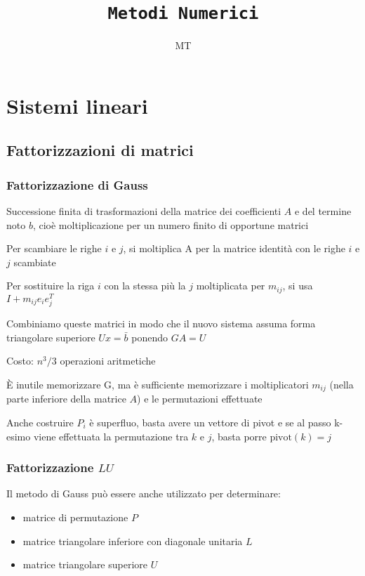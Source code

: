 \documentclass[openany]{book}
\title{\Huge \texttt{Metodi Numerici}}
\date{}
\author{\textsf{MT}}
\begin{document}
\maketitle

\tableofcontents

\chapter{Sistemi lineari}

\section{Fattorizzazioni di matrici}
\subsection{Fattorizzazione di Gauss}

Successione finita di trasformazioni della matrice dei coefficienti $A$ e del termine noto $b$, cioè moltiplicazione per un numero finito di opportune matrici

Per scambiare le righe $i$ e $j$, si moltiplica A per la matrice identità con le righe $ i $  e $ j$  scambiate

Per sostituire la riga $ i$ con la stessa più la $ j$ moltiplicata per $m_{ij}$, si usa $ I + m_{ij}e_ie_j^T$

Combiniamo queste matrici in modo che il nuovo sistema assuma forma triangolare superiore $ Ux = \bar{b} $ ponendo $ GA = U $

Costo: $ n^3/3$ operazioni aritmetiche

È inutile memorizzare G, ma è sufficiente memorizzare i moltiplicatori $ m_{ij}$ (nella parte inferiore della matrice $A$) e le permutazioni effettuate

Anche costruire $P_i$ è superfluo, basta avere un vettore di pivot e se al passo k-esimo viene effettuata la permutazione tra $k$ e $j$, basta porre $\text{pivot}(k)=j$
\subsection{Fattorizzazione $LU$}

Il metodo di Gauss può essere anche utilizzato per determinare: 

\begin{itemize}
	\item matrice di permutazione $P$
	\item matrice triangolare inferiore con diagonale unitaria  $L$
	\item matrice triangolare superiore $U$
\end{itemize}
\end{document}
